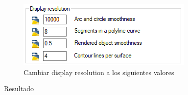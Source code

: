 \documentclass[12pt,letterpaper,final]{report}
\begin{document}
\begin{figure}[H]
	\centering
	\includegraphics[width=0.85\linewidth, height=0.5\textheight,keepaspectratio]{Imagenes/autocad_display_resolution_02}
	\caption{Cambiar display resolution a los siguientes valores}
	\label{fig:autocaddisplayresolution02}
\end{figure}

{\LARGE Resultado}
\end{document}
